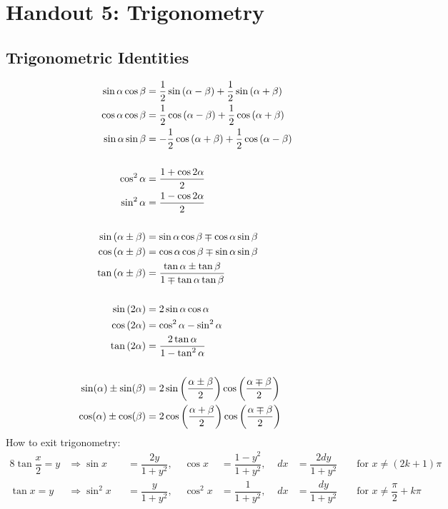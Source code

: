 \documentclass[a4paper,12pt,openany]{book}
\begin{document}
\section{Handout 5: Trigonometry}

\subsection{Trigonometric Identities}

\begin{align*}
    \sin\alpha\cos\beta &= \dfrac{1}{2}\sin{(\alpha-\beta)} + \dfrac{1}{2}\sin{(\alpha+\beta)} \\
    \cos\alpha\cos\beta &= \dfrac{1}{2}\cos{(\alpha-\beta)} + \dfrac{1}{2}\cos{(\alpha+\beta)} \\
    \sin\alpha\sin\beta &= -\dfrac{1}{2}\cos{(\alpha+\beta)} + \dfrac{1}{2}\cos{(\alpha-\beta)} \\
    \vspace{.25in}\\
    \cos^2\alpha &= \dfrac{1+\cos{2\alpha}}{2} \\
    \sin^2\alpha &= \dfrac{1-\cos{2\alpha}}{2} \\
    \vspace{.25in}\\
    \sin{(\alpha \pm \beta)} &= \sin\alpha\cos\beta \mp \cos\alpha\sin\beta \\
    \cos{(\alpha \pm \beta)} &= \cos\alpha\cos\beta \mp \sin\alpha\sin\beta \\
    \tan{(\alpha \pm \beta)} &= \dfrac{\tan\alpha \pm \tan\beta}{1 \mp \tan\alpha\tan\beta}\\
    \vspace{.25in}\\
    \sin{(2\alpha)} &= 2\sin\alpha\cos\alpha \\
    \cos{(2\alpha)} &= \cos^2\alpha - \sin^2\alpha \\
    \tan{(2\alpha)} &= \dfrac{2\tan\alpha}{1-\tan^2\alpha}\\
    \vspace{.25in}\\
    \sin(\alpha) \pm \sin(\beta) &= 2\sin\left(\dfrac{\alpha \pm \beta}{2}\right)\cos\left(\dfrac{\alpha \mp \beta}{2}\right) \\
    \cos(\alpha) \pm \cos(\beta) &= 2\cos\left(\dfrac{\alpha + \beta}{2}\right)\cos\left(\dfrac{\alpha \mp \beta}{2}\right) \\
\end{align*}
How to exit trigonometry:
\begin{alignat*}{8}
    \tan{\dfrac{x}{2}} = y &\Rightarrow \sin x &&= \dfrac{2y}{1+y^2}, &\cos x &= \dfrac{1-y^2}{1+y^2}, & dx &= \dfrac{2dy}{1+y^2} &&\text{ for } x \neq (2k+1)\pi\\
    \tan x = y &\Rightarrow \sin^2 x &&= \dfrac{y}{1+y^2},\,\, &\cos^2 x &= \dfrac{1}{1+y^2},\,\, & dx &= \dfrac{dy}{1+y^2} &&\text{ for } x \neq \dfrac{\pi}{2} + k\pi\\
\end{alignat*}
\pagebreak
\end{document}
